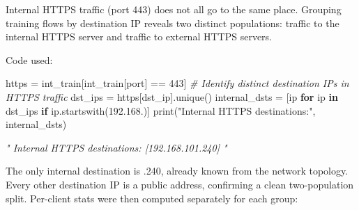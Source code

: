 \documentclass[
  11pt,
]{article}
\newenvironment{Shaded}{\vspace{4pt}}{\vspace{4pt}}
\newcommand{\BuiltInTok}[1]{\textcolor[rgb]{0.00,0.50,0.00}{#1}}
\newcommand{\CommentTok}[1]{\textcolor[rgb]{0.38,0.63,0.69}{\textit{#1}}}
\newcommand{\ControlFlowTok}[1]{\textcolor[rgb]{0.00,0.44,0.13}{\textbf{#1}}}
\newcommand{\DecValTok}[1]{\textcolor[rgb]{0.25,0.63,0.44}{#1}}
\newcommand{\KeywordTok}[1]{\textcolor[rgb]{0.00,0.44,0.13}{\textbf{#1}}}
\newcommand{\NormalTok}[1]{#1}
\newcommand{\OperatorTok}[1]{\textcolor[rgb]{0.40,0.40,0.40}{#1}}
\newcommand{\StringTok}[1]{\textcolor[rgb]{0.25,0.44,0.63}{#1}}
\begin{document}
Internal HTTPS traffic (port 443) does not all go to the same place.
Grouping training flows by destination IP reveals two distinct
populations: traffic to the internal HTTPS server and traffic to
external HTTPS servers.

Code used:

\begin{Shaded}
\begin{Highlighting}[]
\NormalTok{https }\OperatorTok{=}\NormalTok{ int\_train[int\_train[}\StringTok{\textquotesingle{}port\textquotesingle{}}\NormalTok{] }\OperatorTok{==} \DecValTok{443}\NormalTok{]}
\CommentTok{\# Identify distinct destination IPs in HTTPS traffic}
\NormalTok{dst\_ips }\OperatorTok{=}\NormalTok{ https[}\StringTok{\textquotesingle{}dst\_ip\textquotesingle{}}\NormalTok{].unique()}
\NormalTok{internal\_dsts }\OperatorTok{=}\NormalTok{ [ip }\ControlFlowTok{for}\NormalTok{ ip }\KeywordTok{in}\NormalTok{ dst\_ips }\ControlFlowTok{if}\NormalTok{ ip.startswith(}\StringTok{\textquotesingle{}192.168.\textquotesingle{}}\NormalTok{)]}
\BuiltInTok{print}\NormalTok{(}\StringTok{"Internal HTTPS destinations:"}\NormalTok{, internal\_dsts)}

\CommentTok{" Internal HTTPS destinations: [\textquotesingle{}192.168.101.240\textquotesingle{}] "}
\end{Highlighting}
\end{Shaded}

The only internal destination is .240, already known from the network
topology. Every other destination IP is a public address, confirming a
clean two-population split. Per-client stats were then computed
separately for each group:
\end{document}
